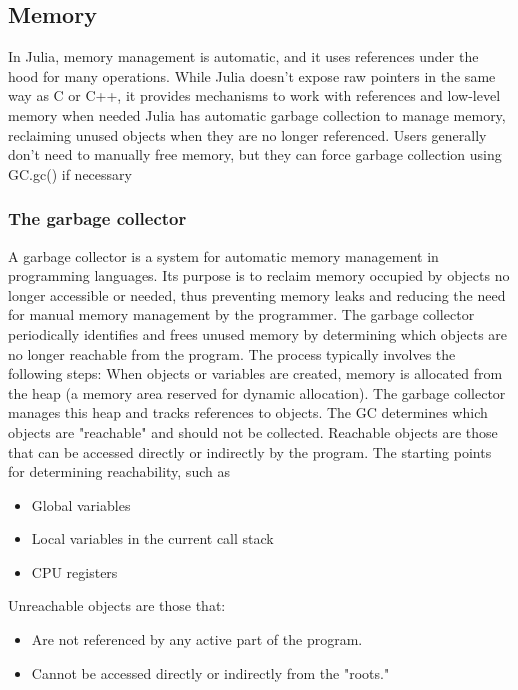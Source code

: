 \documentclass{report}
\begin{document}
    \bigbreak \noindent 
    \subsection{Memory}
    \bigbreak \noindent 
    In Julia, memory management is automatic, and it uses references under the hood for many operations. While Julia doesn’t expose raw pointers in the same way as C or C++, it provides mechanisms to work with references and low-level memory when needed
    \bigbreak \noindent 
    Julia has automatic garbage collection to manage memory, reclaiming unused objects when they are no longer referenced.
    \bigbreak \noindent 
    Users generally don't need to manually free memory, but they can force garbage collection using GC.gc() if necessary
    \bigbreak \noindent 
    \subsubsection{The garbage collector}
    \bigbreak \noindent 
    A garbage collector is a system for automatic memory management in programming languages. Its purpose is to reclaim memory occupied by objects no longer accessible or needed, thus preventing memory leaks and reducing the need for manual memory management by the programmer.
    \bigbreak \noindent 
    The garbage collector periodically identifies and frees unused memory by determining which objects are no longer reachable from the program. The process typically involves the following steps:
    \bigbreak \noindent 
    When objects or variables are created, memory is allocated from the heap (a memory area reserved for dynamic allocation). The garbage collector manages this heap and tracks references to objects.
    \bigbreak \noindent 
    The GC determines which objects are "reachable" and should not be collected. Reachable objects are those that can be accessed directly or indirectly by the program.
    \bigbreak \noindent 
    The starting points for determining reachability, such as
    \begin{itemize}
        \item Global variables
        \item Local variables in the current call stack
        \item CPU registers
    \end{itemize}
    Unreachable objects are those that:
    \begin{itemize}
        \item Are not referenced by any active part of the program.
        \item Cannot be accessed directly or indirectly from the "roots."
    \end{itemize}
\end{document}
